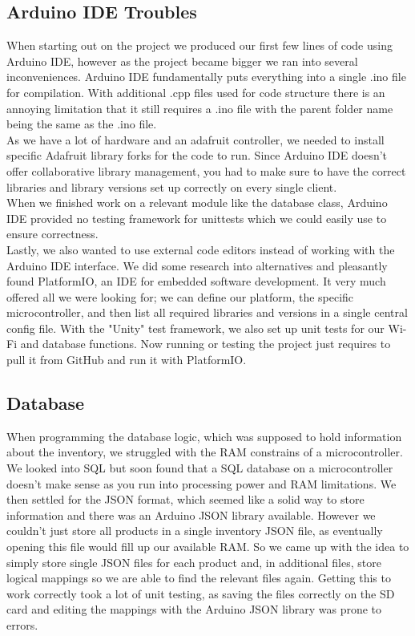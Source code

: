 \documentclass{article}
\begin{document}
\subsection{Arduino IDE Troubles}
When starting out on the project we produced our first few lines of code using Arduino IDE, however as the project became bigger we ran into several inconveniences.
Arduino IDE fundamentally puts everything into a single .ino file for compilation. With additional .cpp files used for code structure there is an annoying limitation that it still requires a .ino file with the parent folder name being the same as the .ino file. \\
As we have a lot of hardware and an adafruit controller, we needed to install specific Adafruit library forks for the code to run.
Since Arduino IDE doesn't offer collaborative library management, you had to make sure to have the correct libraries and library versions set up correctly on every single client. \\
When we finished work on a relevant module like the database class, Arduino IDE provided no testing framework for unittests which we could easily use to ensure correctness. \\
Lastly, we also wanted to use external code editors instead of working with the Arduino IDE interface.
We did some research into alternatives and pleasantly found PlatformIO, an IDE for embedded software development.
It very much offered all we were looking for; we can define our platform, the specific microcontroller, and then list all required libraries and versions in a single central config file.
With the "Unity" test framework, we also set up unit tests for our Wi-Fi and database functions.
Now running or testing the project just requires to pull it from GitHub and run it with PlatformIO.
\subsection{Database}
When programming the database logic, which was supposed to hold information about the inventory, we struggled with the RAM constrains of a microcontroller.
We looked into SQL but soon found that a SQL database on a microcontroller doesn't make sense as you run into processing power and RAM limitations.
We then settled for the JSON format, which seemed like a solid way to store information and there was an Arduino JSON library available.
However we couldn't just store all products in a single inventory JSON file, as eventually opening this file would fill up our available RAM.
So we came up with the idea to simply store single JSON files for each product and, in additional files, store logical mappings so we are able to find the relevant files again.
Getting this to work correctly took a lot of unit testing, as saving the files correctly on the SD card and editing the mappings with the Arduino JSON library was prone to errors.
\end{document}
